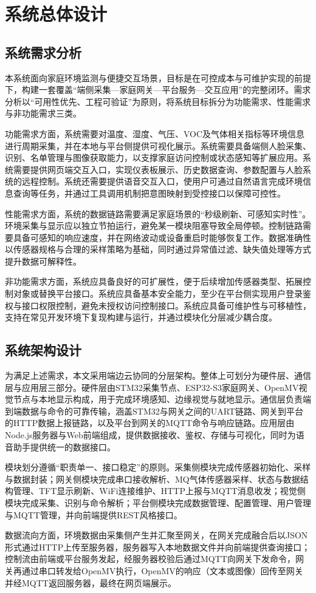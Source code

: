 
\section{系统总体设计}

\subsection{系统需求分析}
\par 本系统面向家庭环境监测与便捷交互场景，目标是在可控成本与可维护实现的前提下，构建一套覆盖“端侧采集—家庭网关—平台服务—交互应用”的完整闭环。需求分析以“可用性优先、工程可验证”为原则，将系统目标拆分为功能需求、性能需求与非功能需求三类。
\par 功能需求方面，系统需要对温度、湿度、气压、VOC及气体相关指标等环境信息进行周期采集，并在本地与平台侧提供可视化展示。系统需要具备端侧人脸采集、识别、名单管理与图像获取能力，以支撑家庭访问控制或状态感知等扩展应用。系统需要提供网页端交互入口，实现仪表板展示、历史数据查询、参数配置与人脸系统的远程控制。系统还需要提供语音交互入口，使用户可通过自然语言完成环境信息查询等任务，并通过工具调用机制把意图映射到受控接口以保障可控性。
\par 性能需求方面，系统的数据链路需要满足家庭场景的“秒级刷新、可感知实时性”。环境采集与显示应以独立节拍运行，避免某一模块阻塞导致全局停顿。控制链路需要具备可感知的响应速度，并在网络波动或设备重启时能够恢复工作。数据准确性以传感器规格与合理的采样策略为基础，同时通过异常值过滤、缺失值处理等方式提升数据可解释性。
\par 非功能需求方面，系统应具备良好的可扩展性，便于后续增加传感器类型、拓展控制对象或替换平台接口。系统应具备基本安全能力，至少在平台侧实现用户登录鉴权与接口权限控制，避免未授权访问控制接口。系统应具备可维护性与可移植性，支持在常见开发环境下复现构建与运行，并通过模块化分层减少耦合度。

\subsection{系统架构设计}
\par 为满足上述需求，本文采用端边云协同的分层架构。整体上可划分为硬件层、通信层与应用层三部分。硬件层由STM32采集节点、ESP32-S3家庭网关、OpenMV视觉节点与本地显示构成，用于完成环境感知、边缘视觉与就地显示。通信层负责端到端数据与命令的可靠传输，涵盖STM32与网关之间的UART链路、网关到平台的HTTP数据上报链路，以及平台到网关的MQTT命令与响应链路。应用层由Node.js服务器与Web前端组成，提供数据接收、鉴权、存储与可视化，同时为语音助手提供统一的数据接口。
\par 模块划分遵循“职责单一、接口稳定”的原则。采集侧模块完成传感器初始化、采样与数据封装；网关侧模块完成串口接收解析、MQ气体传感器采样、状态与数据结构管理、TFT显示刷新、WiFi连接维护、HTTP上报与MQTT消息收发；视觉侧模块完成采集、识别与命令解析；平台侧模块完成数据管理、配置管理、用户管理与MQTT管理，并向前端提供REST风格接口。
\par 数据流向方面，环境数据由采集侧产生并汇聚至网关，在网关完成融合后以JSON形式通过HTTP上传至服务器，服务器写入本地数据文件并向前端提供查询接口；控制流由前端或平台服务发起，经服务器校验后通过MQTT向网关下发命令，网关再通过串口转发给OpenMV执行，OpenMV的响应（文本或图像）回传至网关并经MQTT返回服务器，最终在网页端展示。

